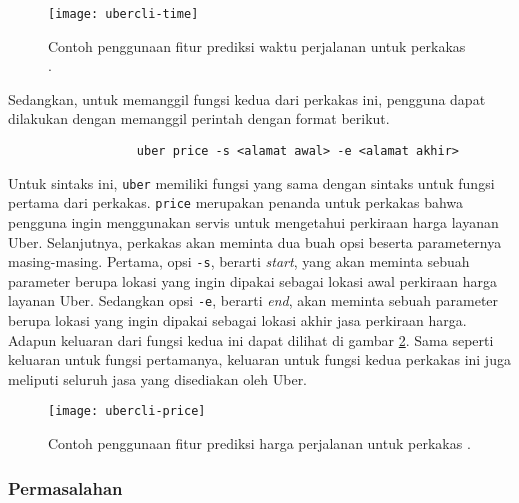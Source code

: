 \begin{figure}[ht]
    \centering
    \texttt{[image: ubercli-time]}
    \caption[Contoh penggunaan perkakas \ubercli (\textit{time})]{Contoh penggunaan fitur prediksi waktu perjalanan untuk perkakas \ubercli.\protect\footnotemark}
    \label{fig:similarapps-ubercli-time}
\end{figure}
\newpage\noindent %
Sedangkan, untuk memanggil fungsi kedua dari perkakas ini, pengguna dapat dilakukan dengan memanggil perintah dengan format berikut.

\begin{verbatim}
                  uber price -s <alamat awal> -e <alamat akhir>
\end{verbatim}

Untuk sintaks ini, \verb|uber| memiliki fungsi yang sama dengan sintaks untuk fungsi pertama dari perkakas. \verb|price| merupakan penanda untuk perkakas bahwa pengguna ingin menggunakan servis untuk mengetahui perkiraan harga layanan Uber. Selanjutnya, perkakas akan meminta dua buah opsi beserta parameternya masing-masing. Pertama, opsi \verb|-s|, berarti \textit{start}, yang akan meminta sebuah parameter berupa lokasi yang ingin dipakai sebagai lokasi awal perkiraan harga layanan Uber. Sedangkan opsi \verb|-e|, berarti \textit{end}, akan meminta sebuah parameter berupa lokasi yang ingin dipakai sebagai lokasi akhir jasa perkiraan harga.
\newline\newline\noindent
Adapun keluaran dari fungsi kedua ini dapat dilihat di gambar \ref{fig:similarapps-ubercli-price}. Sama seperti keluaran untuk fungsi pertamanya, keluaran untuk fungsi kedua perkakas ini juga meliputi seluruh jasa yang disediakan oleh Uber.

\begin{figure}[ht]
    \centering
    \texttt{[image: ubercli-price]}
    \caption[Contoh penggunaan perkakas \ubercli (\textit{price})]{Contoh penggunaan fitur prediksi harga perjalanan untuk perkakas \ubercli.\protect\footnotemark}
    \label{fig:similarapps-ubercli-price}
\end{figure}

\subsubsection{Permasalahan}
\label{sec:similarapps-ubercli-problem}

